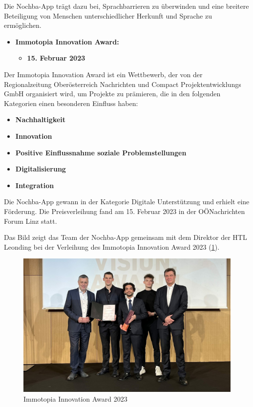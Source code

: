 Die Nochba-App trägt dazu bei, Sprachbarrieren zu überwinden und eine breitere Beteiligung von Menschen unterschiedlicher Herkunft und Sprache zu ermöglichen.


\begin{itemize}
    \item \textbf{Immotopia Innovation Award:}
          \begin{itemize}
              \item \textbf{15. Februar 2023}
          \end{itemize}
\end{itemize}

Der Immotopia Innovation Award \cite{immotopia-nochba} ist ein Wettbewerb, der von der Regionalzeitung Oberösterreich Nachrichten und Compact Projektentwicklungs GmbH organisiert wird, um Projekte zu prämieren, die in den folgenden Kategorien einen besonderen Einfluss haben:

\begin{itemize}
    \item \textbf{Nachhaltigkeit}
    \item \textbf{Innovation}
    \item \textbf{Positive Einflussnahme soziale Problemstellungen}
    \item \textbf{Digitalisierung}
    \item \textbf{Integration}
\end{itemize}

Die Nochba-App gewann in der Kategorie Digitale Unterstützung und erhielt eine Förderung. Die Preisverleihung fand am 15. Februar 2023 in der OÖNachrichten Forum Linz statt.

Das Bild zeigt das Team der Nochba-App gemeinsam mit dem Direktor der HTL Leonding bei der Verleihung des Immotopia Innovation Award 2023 (\ref{fig:Immotopia2023}).

\begin{figure}[H]
    \centering
    \includegraphics[width=1\textwidth]{pics/Immotopia-2023.jpg}
    \caption{Immotopia Innovation Award 2023}
    \label{fig:Immotopia2023}
\end{figure}

